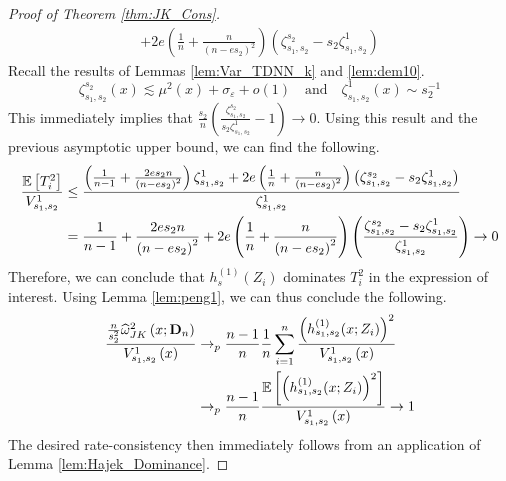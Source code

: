 \begin{proof}[Proof of Theorem \ref{thm:JK_Cons}]
\begin{equation}
\begin{aligned}
			+ 2e\left(\frac{1}{n} + \frac{n}{\left(n - e s_2\right)^2}\right) \left(\zeta_{s_1, s_2}^{s_2} - s_2 \zeta_{s_1, s_2}^{1}\right)
		\end{aligned}
	\end{equation}
	Recall the results of Lemmas \ref{lem:Var_TDNN_k} and \ref{lem:dem10}.
	\begin{equation}
		\zeta_{s_1, s_2}^{s_2}\left(x\right) \lesssim \mu^2(x) + \sigma_{\varepsilon} + o(1)
		\quad \text{and} \quad
		\zeta_{s_1, s_2}^{1}\left(x\right) \sim s_2^{-1}
	\end{equation}
	This immediately implies that $\frac{s_2}{n}\left(\frac{\zeta_{s_1, s_2}^{s_2}}{s_2 \zeta_{s_1, s_2}^{1}} - 1\right) \rightarrow 0$.
	Using this result and the previous asymptotic upper bound, we can find the following.
	\begin{equation}
		\begin{aligned}
			\frac{\mathbb{E}\left[T_{i}^{2}\right]}{V_{s_1, s_2}^{1}}
			 & \leq \frac{\left(\frac{1}{n-1} + \frac{2 e s_2 n}{\left(n - e s_2\right)^2}\right) \zeta_{s_1, s_2}^{1}
			+ 2e\left(\frac{1}{n} + \frac{n}{\left(n - e s_2\right)^2}\right) \left(\zeta_{s_1, s_2}^{s_2} - s_2 \zeta_{s_1, s_2}^{1}\right)}{\zeta_{s_1, s_2}^{1}} \\
			 & = \frac{1}{n-1} + \frac{2 e s_2 n}{\left(n - e s_2\right)^2}
			+ 2e\left(\frac{1}{n} + \frac{n}{\left(n - e s_2\right)^2}\right) \left(\frac{\zeta_{s_1, s_2}^{s_2} - s_2 \zeta_{s_1, s_2}^{1}}{\zeta_{s_1, s_2}^{1}}\right)
			\rightarrow 0
		\end{aligned}
	\end{equation}
	Therefore, we can conclude that $h_{s}^{(1)}\left(Z_{i}\right)$ dominates $T_i^2$ in the expression of interest.
	Using Lemma \ref{lem:peng1}, we can thus conclude the following.
	\begin{equation}
		\begin{aligned}
			\frac{\frac{n}{s_2^2}\widehat{\omega}^{2}_{JK}\left(x; \mathbf{D}_n\right)}{V_{s_1, s_2}^{1}\left(x\right)}
			 & \rightarrow_{p} \frac{n - 1}{n}\frac{1}{n}\sum_{i = 1}^{n}\frac{\left(h^{(1)}_{s_1, s_2}(x; Z_{i})\right)^{2}}{V_{s_1, s_2}^{1}\left(x\right)} \\\
			 & \rightarrow_{p} \frac{n - 1}{n}\frac{\mathbb{E}\left[\left(h^{(1)}_{s_1, s_2}(x; Z_{i})\right)^{2}\right]}{V_{s_1, s_2}^{1}\left(x\right)}
			\rightarrow 1
		\end{aligned}
	\end{equation}
	The desired rate-consistency then immediately follows from an application of Lemma \ref{lem:Hajek_Dominance}.
\end{proof}

